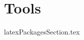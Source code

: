 \documentclass[class=report , crop=false, openany, titlepage, twoside, multi={itemize, figure, verbatim}, float=false]{standalone}
\title{}  %
\begin{document}
\ifstandalone
\maketitle %
\clearpage
\tableofcontents %
\clearpage
\fi

\chapter{Tools}
{latexPackagesSection.tex}
\end{document}

